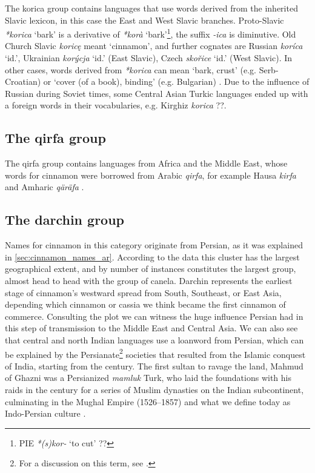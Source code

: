 The korica group contains languages that use words derived from the inherited Slavic lexicon, in this case the East and West Slavic branches. Proto-Slavic \textit{*korica} `bark' is a derivative of \textit{*korà} `bark'\footnote{\gls{PIE} \textit{*(s)kor-} `to cut' ??}, the suffix \textit{-ica} is diminutive. Old Church Slavic \textit{koricę} meant `cinnamon', and further cognates are Russian \textit{koríca} `id.', Ukrainian  \textit{korýcja} `id.' (East Slavic), Czech \textit{skořice} `id.' (West Slavic). In other cases, words derived from \textit{*korica} can mean `bark, crust' (e.g. Serb-Croatian) or `cover (of a book), binding' (e.g. Bulgarian) \autocite[235]{derksen_etymological_2008}. Due to the influence of Russian during Soviet times, some Central Asian Turkic languages ended up with a foreign words in their vocabularies, e.g. Kirghiz  \textit{korica} ??.

\subsection{The qirfa group}

The qirfa group contains languages from Africa and the Middle East, whose words for cinnamon were borrowed from Arabic \textit{qirfa}, for example Hausa \textit{kirfa} \autocite[114]{newman_hausa-english_2007} and Amharic  \textit{qäräfa} \autocite[74]{leslau_concise_1996}.

\subsection{The darchin group}

Names for cinnamon in this category originate from Persian, as it was explained in \cref{sec:cinnamon_names_ar}. According to the data this cluster has the largest geographical extent, and by number of instances constitutes the largest group, almost head to head with the group of canela. Darchin represents the earliest stage of cinnamon's westward spread from South, Southeast, or East Asia, depending which cinnamon or cassia we think became the first cinnamon of commerce. Consulting the plot we can witness the huge influence Persian had in this step of transmission to the Middle East and Central Asia. We can also see that central and north Indian languages use a loanword from Persian, which can be explained by the Persianate\footnote{For a discussion on this term, see \textcite{green_persianate_2019}.} societies that resulted from the Islamic conquest of India, starting from the  century. The first sultan to ravage the land, Mahmud of Ghazni was a Persianized \textit{mamluk} Turk, who laid the foundations with his raids in the  century for a series of Muslim dynasties on the Indian subcontinent, culminating in the Mughal Empire (1526–1857) and what we define today as Indo-Persian culture \autocite[33]{eaton_india_2019}.


